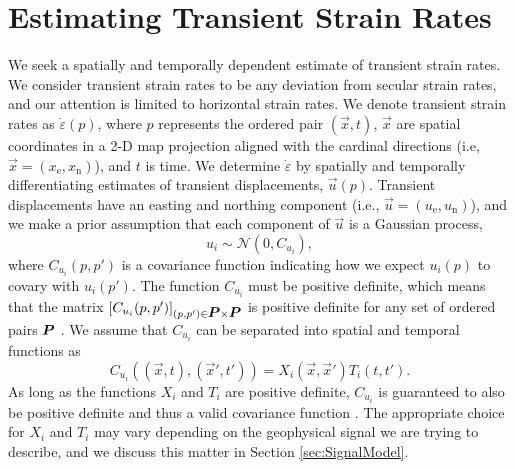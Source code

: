 \documentclass[extra,mreferee]{gji}
\begin{document}
\section{Estimating Transient Strain Rates}\label{sec:Method}
We seek a spatially and temporally dependent estimate of transient strain rates. We consider transient strain rates to be any deviation from secular strain rates, and our attention is limited to horizontal strain rates. We denote transient strain rates as $\dot\varepsilon(p)$, where $p$ represents the ordered pair $(\vec{x},t)$, $\vec{x}$ are spatial coordinates in a 2-D map projection aligned with the cardinal directions (i.e, $\vec{x} = (x_\mathrm{e},x_\mathrm{n})$), and $t$ is time. We determine $\dot\varepsilon$ by spatially and temporally differentiating estimates of transient displacements, $\vec{u}(p)$. Transient displacements have an easting and northing component (i.e., $\vec{u} = (u_\mathrm{e}, u_\mathrm{n})$), and we make a prior assumption that each component of $\vec{u}$ is a Gaussian process,
\begin{equation}\label{eq:TransientDeformation}
u_i \sim \mathcal{N}\left(0,C_{u_i}\right),
\end{equation}
where $C_{u_i}(p,p')$ is a covariance function indicating how we expect $u_i(p)$ to covary with $u_i(p')$. The function $C_{u_i}$ must be positive definite, which means that the matrix $[C_{u_i}(p,p')]_{(p,p') \in \mitbf{P} \times \mitbf{P}}$ is positive definite for any set of ordered pairs $\mitbf{P}$ \citep[sec. 2.5]{Cressie1992}. We assume that $C_{u_i}$ can be separated into spatial and temporal functions as 
\begin{equation}\label{eq:TransientCovariance}
C_{u_i}\left((\vec{x},t),(\vec{x}',t')\right) = X_i(\vec{x},\vec{x}')T_i(t,t').
\end{equation}  
As long as the functions $X_i$ and $T_i$ are positive definite, $C_{u_i}$ is guaranteed to also be positive definite and thus a valid covariance function \citep[sec. 4.2.4]{Rasmussen2006}. The appropriate choice for $X_i$ and $T_i$ may vary depending on the geophysical signal we are trying to describe, and we discuss this matter in Section \ref{sec:SignalModel}. 
\end{document}
